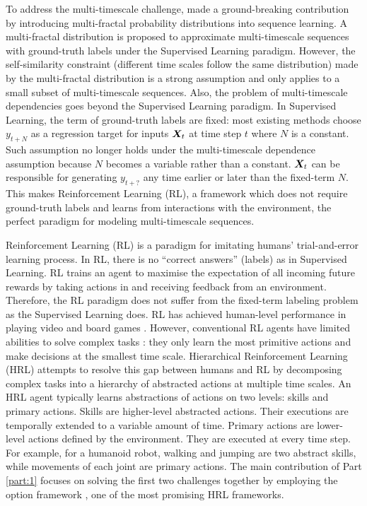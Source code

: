 To address the multi-timescale challenge,
 made a ground-breaking
contribution by introducing multi-fractal probability
distributions into sequence learning. A multi-fractal
distribution is proposed to approximate multi-timescale sequences
with ground-truth labels under the Supervised Learning paradigm.
However, the self-similarity constraint (different time scales
follow the same distribution) made by the multi-fractal
distribution is a strong assumption and only applies to a small
subset of multi-timescale sequences. Also, the problem of
multi-timescale dependencies goes beyond the Supervised Learning
paradigm. In Supervised Learning, the term of ground-truth labels
are fixed: most existing methods choose $y_{t+N}$ as a regression
target for inputs ${\bm{X}}_t$ at time step $t$ where $N$ is a
constant. Such assumption no longer holds under the
multi-timescale dependence assumption because $N$ becomes a
variable rather than a constant. ${\bm{X}}_t$ can be responsible for
generating $y_{t+?}$ any time earlier or later than the
fixed-term $N$. This makes Reinforcement Learning
\cite{sutton2018reinforcement} (RL), a framework which does not
require ground-truth labels and learns from interactions with the
environment, the perfect paradigm for modeling multi-timescale
sequences.

Reinforcement Learning (RL) is a paradigm for imitating humans'
trial-and-error learning process. In RL, there is no ``correct
answers'' (labels) as in Supervised Learning. RL trains an agent
to maximise the expectation of all incoming future rewards by
taking actions in and receiving feedback from an environment.
Therefore, the RL paradigm does not suffer from the fixed-term
labeling problem as the Supervised Learning does. RL has achieved
human-level performance in playing video and board games
\cite{mnih2015human,silver2016mastering}. However, conventional
RL agents have limited abilities to solve complex tasks
\cite{daniel2016probabilistic}: they only learn the most
primitive actions and make decisions at the smallest time scale.
Hierarchical Reinforcement Learning (HRL) attempts to resolve
this gap between humans and RL by decomposing complex tasks into
a hierarchy of abstracted actions at multiple time scales. An HRL
agent typically learns abstractions of actions on two levels:
skills and primary actions. Skills are higher-level abstracted
actions. Their executions are temporally extended to a variable
amount of time. Primary actions are lower-level actions defined
by the environment. They are executed at every time step. For
example, for a humanoid robot, walking and jumping are two
abstract skills, while movements of each joint are primary
actions. The main contribution of Part \ref{part:1} focuses on
solving the first two challenges together by employing the option
framework \cite{sutton1999between}, one of the most promising HRL
frameworks.

